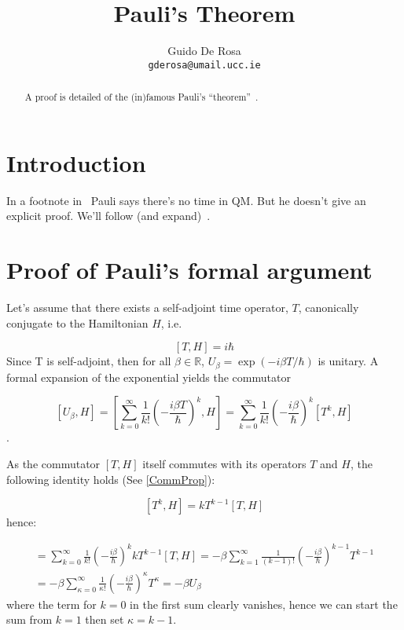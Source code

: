 \documentclass[a4paper,12pt]{article}
\author{Guido De Rosa \\ \small\tt{gderosa@umail.ucc.ie}}
\title{Pauli's Theorem}
\begin{document}
\maketitle

\begin{abstract}
A proof is detailed of the (in)famous Pauli's ``theorem''~\cite[footnote~2]{PauliFootnote}.
\end{abstract}

\section{Introduction}

In a footnote in~\cite{PauliFootnote} Pauli says there's no time in QM. But he
doesn't give an explicit proof. We'll follow (and expand)~\cite{Galapon2002}.

\section{Proof of Pauli's formal argument}\label{proof}

Let's assume that there exists a self-adjoint time operator, $T$, canonically conjugate
to the Hamiltonian $H$, i.e.

$$
[T, H] = i\hbar
$$
Since T is self-adjoint, then for all
$\beta\in\mathbb{R}$, $U_{\beta} = \exp(- i \beta T / \hbar)$
is unitary. A formal
expansion of the exponential yields the commutator

$$
[U_{\beta}, H]  = 
\left[
    \sum_{k=0}^{\infty} \frac{1}{k!} \left(- \frac{i\beta T}{\hbar} \right)^k, H
\right]         =
\sum_{k=0}^{\infty} \frac{1}{k!} \left(- \frac{i\beta}{\hbar} \right)^k [T^k, H]
$$.

As the commutator $[T, H]$ itself commutes with its operators $T$ and $H$,
the following identity holds (See \ref{CommProp}):

$$
[T^k, H] = kT^{k-1}[T, H]
$$
hence:

\begin{multline}
[U_{\beta}, H]  = 
\sum_{k=0}^{\infty} \frac{1}{k!} \left(- \frac{i\beta}{\hbar} \right)^k kT^{k-1}[T, H] =
-\beta\sum_{k=1}^{\infty} \frac{1}{(k-1)!} \left(- \frac{i\beta}{\hbar} \right)^{k-1} T^{k-1} \\ =
-\beta\sum_{\kappa=0}^{\infty} \frac{1}{\kappa!} \left(- \frac{i\beta}{\hbar} \right)^{\kappa} T^{\kappa} =
-\beta U_{\beta}
\end{multline}
where the term for $k=0$ in the first sum clearly vanishes, hence we can start the sum from 
$k=1$ then set $\kappa=k-1$.
\end{document}
